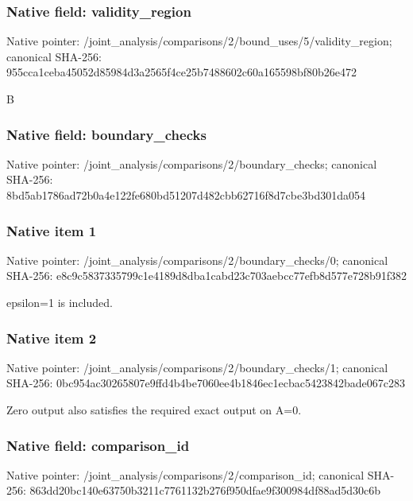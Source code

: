 \documentclass[10pt,a4paper]{article}
\begin{document}
\subsubsection{Native field: validity\_\allowbreak{}region}
Native pointer: /joint\_\allowbreak{}analysis/comparisons/2/bound\_\allowbreak{}uses/5/validity\_\allowbreak{}region; canonical SHA-256: 955cca1ceba45052d85984d3a2565f4ce25b7488602c60a165598bf80b26e472

\begingroup\raggedright\sloppy B\par\endgroup

\subsubsection{Native field: boundary\_\allowbreak{}checks}
Native pointer: /joint\_\allowbreak{}analysis/comparisons/2/boundary\_\allowbreak{}checks; canonical SHA-256: 8bd5ab1786ad72b0a4e122fe680bd51207d482cbb62716f8d7cbe3bd301da054

\subsubsection{Native item 1}
Native pointer: /joint\_\allowbreak{}analysis/comparisons/2/boundary\_\allowbreak{}checks/0; canonical SHA-256: e8c9c5837335799c1e4189d8dba1cabd23c703aebcc77efb8d577e728b91f382

\begingroup\raggedright\sloppy epsilon=\allowbreak{}1 is included.\par\endgroup

\subsubsection{Native item 2}
Native pointer: /joint\_\allowbreak{}analysis/comparisons/2/boundary\_\allowbreak{}checks/1; canonical SHA-256: 0bc954ac30265807e9ffd4b4be7060ee4b1846ec1ecbac5423842bade067c283

\begingroup\raggedright\sloppy Zero output also satisfies the required exact output on A=\allowbreak{}0.\par\endgroup

\subsubsection{Native field: comparison\_\allowbreak{}id}
Native pointer: /joint\_\allowbreak{}analysis/comparisons/2/comparison\_\allowbreak{}id; canonical SHA-256: 863dd20bc140e63750b3211c7761132b276f950dfae9f300984df88ad5d30c6b
\end{document}
